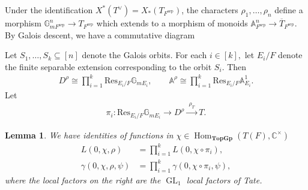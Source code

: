 \documentclass[10pt]{amsart}
\newtheorem{lemma}[theorem]{Lemma}
\theoremstyle{definition}
\numberwithin{equation}{section}
\DeclareMathOperator{\Hom}{\mathrm{Hom}}
\DeclareMathOperator{\GL}{\mathrm{GL}}
\numberwithin{equation}{subsection}
\begin{document}
Under the identification $X^*(T^\vee) = X_*(T_{F^{\mathrm{sep}}})$, the characters $\rho_1,\ldots,\rho_n$ define a morphism $\mathbb{G}_{mF^{\mathrm{sep}}}^n\to T_{F^{\mathrm{sep}}}$ which extends to a morphism of monoids $\mathbb{A}_{F^{\mathrm{sep}}}^n\to \overline{T}_{F^{\mathrm{sep}}}$. By Galois descent, we have a commutative diagram
\begin{center}
\end{center}
Let $S_1,\ldots,S_k\subseteq [n]$ denote the Galois orbits. For each $i\in[k],$ let $E_i/F$ denote the finite separable extension corresponding to the orbit $S_i$. Then
\begin{align*}
    D^\rho \cong \prod_{i=1}^k \mathrm{Res}_{E_i/F}\mathbb{G}_{mE_i},\qquad \mathbb{A}^\rho \cong \prod_{i=1}^k \mathrm{Res}_{E_i/F}\mathbb{A}^1_{E_i}.
\end{align*}
Let 
\begin{align}\label{eq:pii}
\pi_i:\mathrm{Res}_{E_i/F}\mathbb{G}_{mE_i}\longrightarrow D^\rho\xrightarrow{\,\,\rho_T\,\,}T.
\end{align}
\begin{lemma}\label{etaleTate:local:factr:equal} 
We have identities of functions in $\chi\in \Hom_{\mathbf{TopGp}}(T(F),\mathbb{C}^\times)$
\begin{align*}
    L(0,\chi,\rho) &= \prod_{i=1}^k L(0,\chi\circ \pi_i),\\
    \gamma(0,\chi,\rho,\psi) &= \prod_{i=1}^k \gamma(0,\chi\circ \pi_i,\psi),
\end{align*}
where the local factors on the right are the $\GL_1$ local factors of Tate.
\end{lemma}
\end{document}
